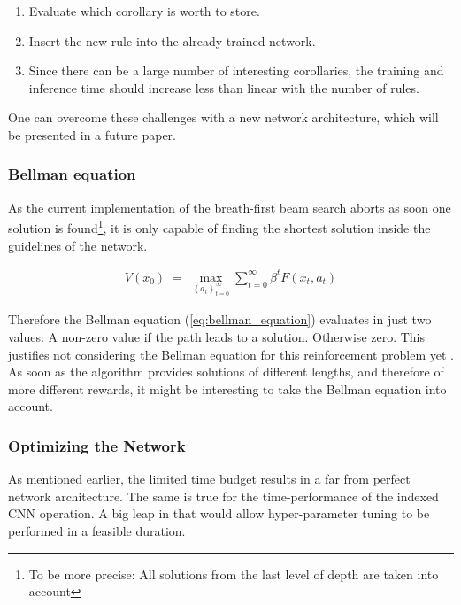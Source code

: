 \documentclass{scrartcl}
\theoremstyle{definition}
\begin{document}
\begin{enumerate}[label=(\roman*)]
	\item Evaluate which corollary is worth to store.
	\item Insert the new rule into the already trained network.
	\item Since there can be a large number of interesting corollaries, the training and inference time should increase less than linear with the number of rules.
\end{enumerate}

One can overcome these challenges with a new network architecture, which will be presented in a future paper.

\subsubsection{Bellman equation}

As the current implementation of the breath-first beam search aborts as soon one solution is found\footnote{To be more precise: All solutions from the last level of depth are taken into account},
it is only capable of finding the shortest solution inside the guidelines of the network. 

\begin{align}
	V(x_{0})\;=\;\max _{\left\{a_{t}\right\}_{t=0}^{\infty }}\sum _{t=0}^{\infty }\beta ^{t}F(x_{t},a_{t})
	\label{eq:bellman_equation}
\end{align}

Therefore the Bellman equation (\ref{eq:bellman_equation}) evaluates in just two values:
A non-zero value if the path leads to a solution. Otherwise zero.
This justifies not considering the Bellman equation for this reinforcement problem yet \cite{bellman}.
As soon as the algorithm provides solutions of different lengths, and therefore of more different rewards, it might be interesting to take the Bellman equation into account.


\subsubsection{Optimizing the Network}

As mentioned earlier, the limited time budget results in a far from perfect network architecture.
The same is true for the time-performance of the indexed CNN operation.
A big leap in that would allow hyper-parameter tuning to be performed in a feasible duration.
\end{document}
